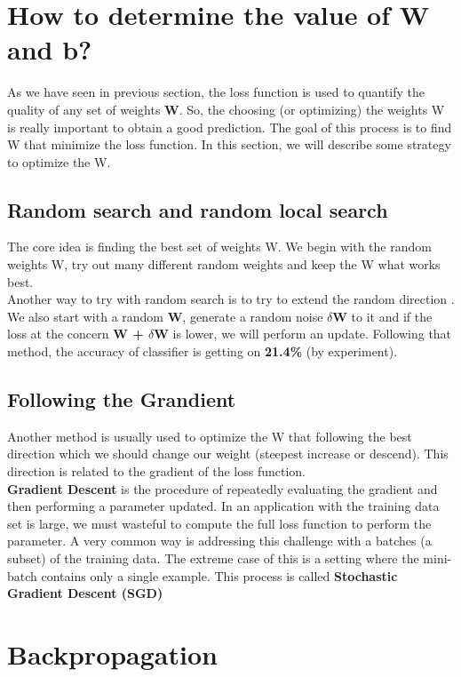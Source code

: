 \section{How to determine the value of W and b?}
As we have seen in previous section, the loss function is used to quantify the quality of any set of weights \textbf{W}. So, the choosing (or optimizing) the weights W is really important to obtain a good prediction. The goal of this process is to find W that minimize the loss function. In this section, we will describe some strategy to optimize the W.
	\subsection{Random search and random local search}
	The core idea is finding the best set of weights W. We begin with the random weights W, try out many different random weights and keep the W what works best.\\[0.2cm]
	Another way to try with random search is to try to extend the random direction . We also start with a random \textbf{W}, generate a random noise \textbf{$\delta$W} to it and if the loss at the concern \textbf{W + $\delta$W} is lower, we will perform an update. Following that method, the accuracy of classifier is getting on \textbf{21.4\%} (by experiment).
	\subsection{Following the Grandient}
	Another method is usually used to optimize the W that following the best direction which we should change our weight (steepest increase or descend). This direction is related to the gradient of the loss function. \\[0.2cm]
	\textbf{Gradient Descent} is the procedure of repeatedly evaluating the gradient and then performing a parameter updated. In an application with the training data set is large, we must wasteful to compute the full loss function to perform the parameter. A very common way is addressing this challenge with a batches (a subset) of the training data. The extreme case of this is a setting where the mini-batch contains only a single example. This process is called \textbf{Stochastic Gradient Descent (SGD)}
\section{Backpropagation}